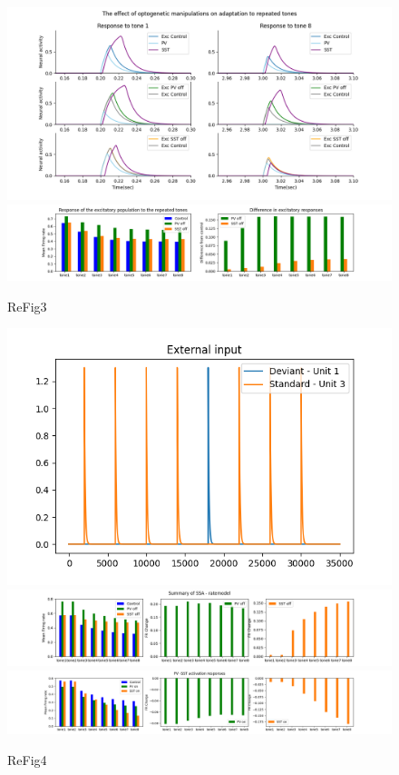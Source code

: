 \begin{figure}
 
 \includegraphics[width=\textwidth]{Figures/Fig3B}
 \includegraphics[width=\textwidth]{Figures/Fig3C}
 \caption{ReFig3}
\end{figure}

\begin{figure}
 \includegraphics[width=\textwidth]{Figures/Fig4A}
 \includegraphics[width=\textwidth]{Figures/Fig4BDE}
 \includegraphics[width=\textwidth]{Figures/Fig4F}
 \caption{ReFig4}
\end{figure}

